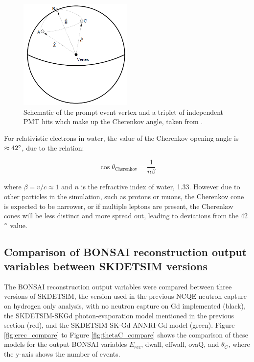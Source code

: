 \begin{figure}[htp]
    \centering
    \includegraphics[width=0.5\textwidth]{Figures/cherenkov_hit_triplet.png}
    \caption[Schematic of the prompt event vertex and a triplet of independent PMT hits whch make up the Cherenkov angle.]{Schematic of the prompt event vertex and a triplet of independent PMT hits whch make up the Cherenkov angle, taken from \cite{malek_thesis}.}
    \label{fig:cherenkov_hit_triplet}

\end{figure}


 For relativistic electrons in water, the value of the Cherenkov opening angle is $\approx 42\degree$, due to the relation: 

 \begin{equation}
\cos \theta_{\mathrm{Cherenkov}}=\frac{1}{n\beta}
\label{cherenkov_angle}
\end{equation}
 
where $\beta = v/c \approx 1$ and $n$ is the refractive index of water, 1.33. However due to other particles in the simulation, such as protons or muons, the Cherenkov cone is expected to be narrower, or if multiple leptons are present, the Cherenkov cones will be less distinct and more spread out, leading to deviations from the 42$\degree$ value. 

\subsection{Comparison of BONSAI reconstruction output variables between SKDETSIM versions}

The BONSAI reconstruction output variables were compared between three versions of SKDETSIM, the version used in the previous NCQE neutron capture on hydrogen only analysis, with no neutron capture on Gd implemented (black), the SKDETSIM-SKGd photon-evaporation model mentioned in the previous section (red), and the SKDETSIM SK-Gd ANNRI-Gd model (green). Figure \ref{fig:erec_compare} to Figure \ref{fig:thetaC_compare} shows the comparison of these models for the output BONSAI variables $E_{rec}$, dwall, effwall, ovaQ, and $\theta_C$, where the y-axis shows the number of events.

